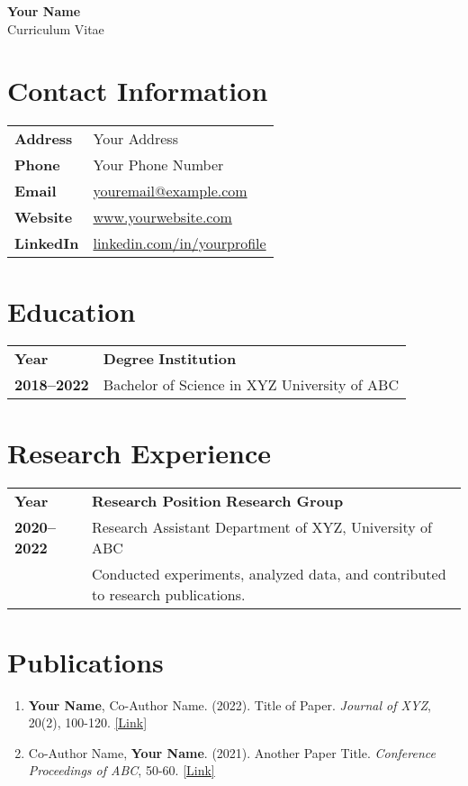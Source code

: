 \documentclass[11pt,a4paper]{article}
\begin{document}
\begin{center}
  \textbf{\LARGE Your Name} \\
  \vspace{0.5em}
  Curriculum Vitae
\end{center}

\section*{Contact Information}
\begin{tabular}{@{}p{3.5cm}p{10cm}}
  \textbf{Address} & Your Address \\
  \textbf{Phone} & Your Phone Number \\
  \textbf{Email} & \href{mailto:youremail@example.com}{youremail@example.com} \\
  \textbf{Website} & \href{http://www.yourwebsite.com}{www.yourwebsite.com} \\
  \textbf{LinkedIn} & \href{http://www.linkedin.com/in/yourprofile}{linkedin.com/in/yourprofile} \\
\end{tabular}

\section*{Education}
\begin{tabular}{@{}p{3.5cm}p{10cm}}
  \textbf{Year} & \textbf{Degree} \hfill \textbf{Institution} \\
  \textbf{2018--2022} & Bachelor of Science in XYZ \hfill University of ABC \\
\end{tabular}

\section*{Research Experience}
\begin{tabular}{@{}p{3.5cm}p{10cm}}
  \textbf{Year} & \textbf{Research Position} \hfill \textbf{Research Group} \\
  \textbf{2020--2022} & Research Assistant \hfill Department of XYZ, University of ABC \\
  & Conducted experiments, analyzed data, and contributed to research publications. \\
\end{tabular}

\section*{Publications}
\begin{enumerate}[leftmargin=0.5cm,itemsep=1ex]
  \item \textbf{Your Name}, Co-Author Name. (2022). Title of Paper. \emph{Journal of XYZ}, 20(2), 100-120. \href{http://www.example.com/paper1}{[Link]}
  \item Co-Author Name, \textbf{Your Name}. (2021). Another Paper Title. \emph{Conference Proceedings of ABC}, 50-60. \href{http://www.example.com/paper2}{[Link]}
\end{enumerate}
\end{document}
